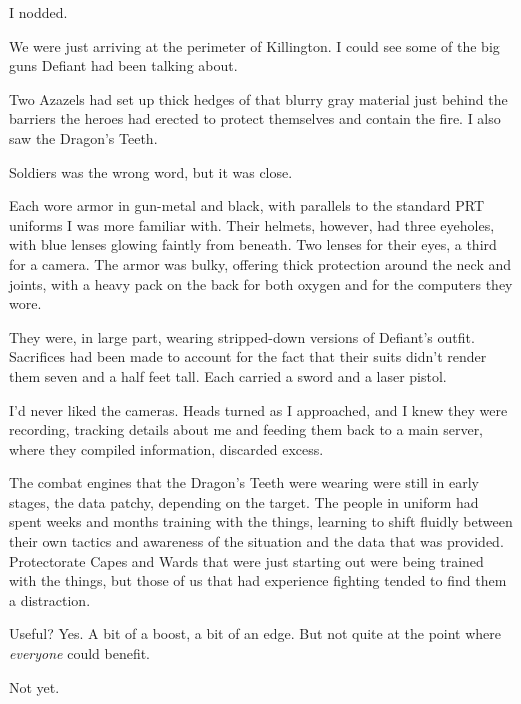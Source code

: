 I nodded.



We were just arriving at the perimeter of Killington.  I could see some of the big guns Defiant had been talking about.



Two Azazels had set up thick hedges of that blurry gray material just behind the barriers the heroes had erected to protect themselves and contain the fire.  I also saw the Dragon's Teeth.



Soldiers was the wrong word, but it was close.



Each wore armor in gun-metal and black, with parallels to the standard PRT uniforms I was more familiar with.  Their helmets, however, had three eyeholes, with blue lenses glowing faintly from beneath.  Two lenses for their eyes, a third for a camera.  The armor was bulky, offering thick protection around the neck and joints, with a heavy pack on the back for both oxygen and for the computers they wore.



They were, in large part, wearing stripped-down versions of Defiant's outfit.  Sacrifices had been made to account for the fact that their suits didn't render them seven and a half feet tall.  Each carried a sword and a laser pistol.



I'd never liked the cameras.  Heads turned as I approached, and I knew they were recording, tracking details about me and feeding them back to a main server, where they compiled information, discarded excess.



The combat engines that the Dragon's Teeth were wearing were still in early stages, the data patchy, depending on the target.  The people in uniform had spent weeks and months training with the things, learning to shift fluidly between their own tactics and awareness of the situation and the data that was provided.  Protectorate Capes and Wards that were just starting out were being trained with the things, but those of us that had experience fighting tended to find them a distraction.



Useful?  Yes.  A bit of a boost, a bit of an edge.  But not quite at the point where \emph{everyone} could benefit.



Not yet.



